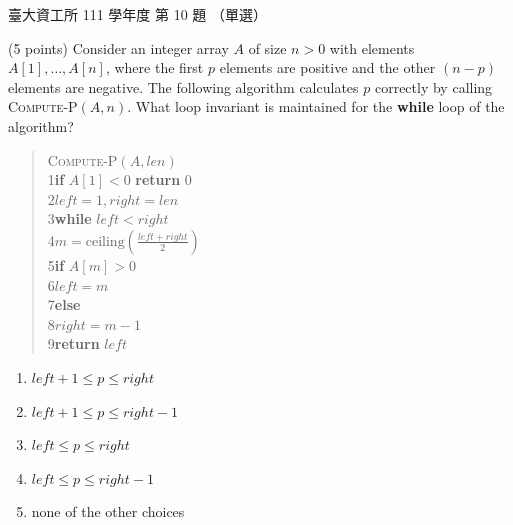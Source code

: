 \begin{pastexam}[label={px:ntu-111-dsaa-10}]{臺大資工所 111 學年度 第 10 題}
（單選）

(5 points) Consider an integer array $A$ of size $n>0$ with elements $A[1],\ldots,A[n]$, where
the first $p$ elements are positive and the other $(n-p)$ elements are negative. The following
algorithm calculates $p$ correctly by calling \textsc{Compute-P}$(A,n)$. What loop invariant is
maintained for the \textbf{while} loop of the algorithm?

\begin{quote}
\textsc{Compute-P}$(A, len)$\\
1\quad \textbf{if} $A[1]<0$ \textbf{return} 0\\
2\quad $left=1, right=len$\\
3\quad \textbf{while} $left<right$\\
4\quad\quad $m=\text{ceiling}(\frac{left+right}{2})$\\
5\quad\quad \textbf{if} $A[m]>0$\\
6\quad\quad\quad $left=m$\\
7\quad\quad \textbf{else}\\
8\quad\quad\quad $right=m-1$\\
9\quad \textbf{return} $left$
\end{quote}
\begin{enumerate}[label=(\Alph*)]
\item $left+1\le p\le right$
\item $left+1\le p\le right-1$
\item $left\le p\le right$
\item $left\le p\le right-1$
\item none of the other choices
\end{enumerate}
\end{pastexam}

